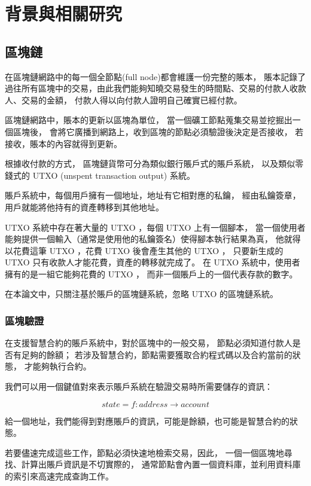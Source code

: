 \graphicspath{ {./images/} }
\chapter{背景與相關研究}
\label{c:background}


\section{區塊鏈}

在區塊鏈網路中的每一個全節點(full node)都會維護一份完整的賬本，
賬本記錄了過往所有區塊中的交易，由此我們能夠知曉交易發生的時間點、交易的付款人收款人、交易的金額，
付款人得以向付款人證明自己確實已經付款。

區塊鏈網路中，賬本的更新以區塊為單位，
當一個礦工節點蒐集交易並挖掘出一個區塊後，
會將它廣播到網路上，收到區塊的節點必須驗證後決定是否接收，
若接收，賬本的內容就得到更新。

根據收付款的方式， 區塊鏈貨幣可分為類似銀行賬戶式的賬戶系統，
以及類似零錢式的 UTXO (unspent transaction output) 系統。

賬戶系統中，每個用戶擁有一個地址，地址有它相對應的私鑰，
經由私鑰簽章，用戶就能將他持有的資產轉移到其他地址。

UTXO 系統中存在著大量的 UTXO ，每個 UTXO 上有一個腳本，
當一個使用者能夠提供一個輸入（通常是使用他的私鑰簽名）使得腳本執行結果為真，
他就得以花費這筆 UTXO ，花費 UTXO 後會產生其他的 UTXO ，
只要新生成的 UTXO 只有收款人才能花費，資產的轉移就完成了。
在 UTXO 系統中，使用者擁有的是一組它能夠花費的 UTXO ，
而非一個賬戶上的一個代表存款的數字。

在本論文中，只關注基於賬戶的區塊鏈系統，忽略 UTXO 的區塊鏈系統。

\subsection{區塊驗證}

在支援智慧合約的賬戶系統中，對於區塊中的一般交易，
節點必須知道付款人是否有足夠的餘額；
若涉及智慧合約，節點需要獲取合約程式碼以及合約當前的狀態，
才能夠執行合約。

我們可以用一個鍵值對來表示賬戶系統在驗證交易時所需要儲存的資訊：

\[state = f: address\to account \]

給一個地址，我們能得到對應賬戶的資訊，可能是餘額，也可能是智慧合約的狀態。

若要儘速完成這些工作，節點必須快速地檢索交易，因此，
一個一個區塊地尋找、計算出賬戶資訊是不切實際的， 
通常節點會內置一個資料庫，並利用資料庫的索引來高速完成查詢工作。

